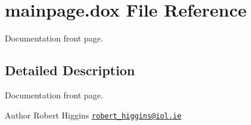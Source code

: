 \hypertarget{mainpage_8dox}{\section{mainpage.\-dox File Reference}
\label{mainpage_8dox}
}


Documentation front page.  




\subsection{Detailed Description}
Documentation front page. \begin{DoxyAuthor}{Author}
Robert Higgins \href{mailto:robert_higgins@iol.ie}{\tt robert\-\_\-higgins@iol.\-ie} 
\end{DoxyAuthor}
